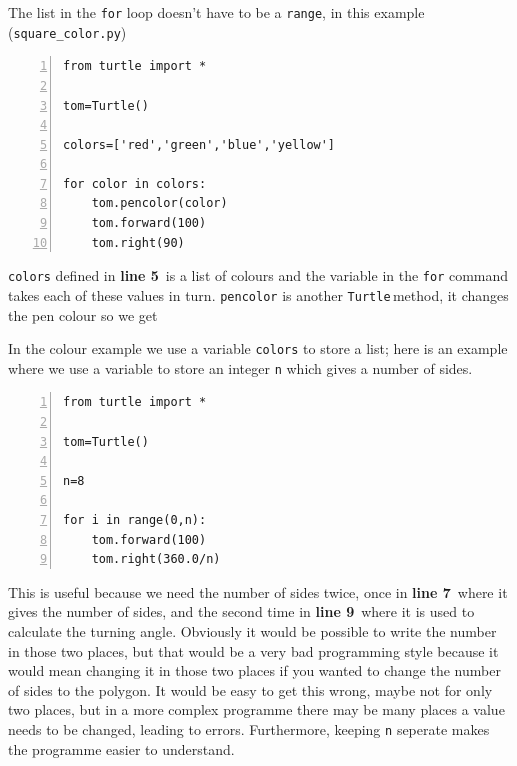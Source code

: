 \documentclass[11pt,a4paper]{scrartcl}
\newcommand{\turtle}{\texttt{Turtle}\,}
\newcommand{\lnn}[1]{\textbf{line #1}\,}
\begin{document}
The list in the \texttt{for} loop doesn't have to be a \texttt{range},
in this example (\texttt{square\_color.py})
\begin{lstlisting}[numbers=left]
from turtle import *

tom=Turtle()

colors=['red','green','blue','yellow']

for color in colors:
    tom.pencolor(color)
    tom.forward(100)
    tom.right(90)
\end{lstlisting}
\texttt{colors} defined in \lnn{5} is a list of colours and the
variable in the \texttt{for} command takes each of these values in
turn. \texttt{pencolor} is another \turtle method, it changes the pen
colour so we get
\begin{center}
\end{center}

In the colour example we use a variable \texttt{colors} to store a
list; here is an example where we use a variable to store an integer
\texttt{n} which gives a number of sides.
\begin{lstlisting}[numbers=left]
from turtle import *

tom=Turtle()

n=8

for i in range(0,n):
    tom.forward(100)
    tom.right(360.0/n)

\end{lstlisting}
This is useful because we need the number of sides twice, once in
\lnn{7} where it gives the number of sides, and the second time in
\lnn{9} where it is used to calculate the turning angle. Obviously it
would be possible to write the number in those two places, but that
would be a very bad programming style because it would mean changing
it in those two places if you wanted to change the number of sides to
the polygon. It would be easy to get this wrong, maybe not for only
two places, but in a more complex programme there may be many places a
value needs to be changed, leading to errors. Furthermore, keeping
\texttt{n} seperate makes the programme easier to understand.
\end{document}
